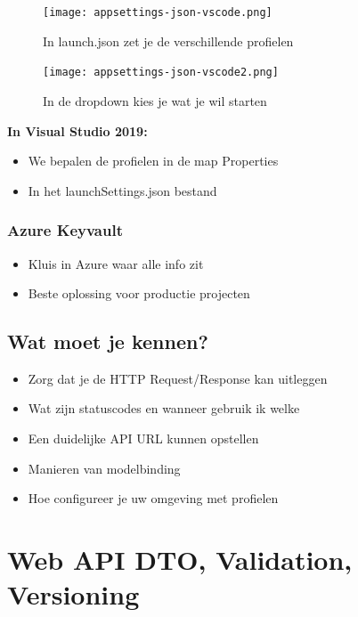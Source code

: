 \documentclass{article}
\begin{document}
\begin{figure}[H]
    \centering
    \texttt{[image: appsettings-json-vscode.png]}
    \caption{In launch.json zet je de verschillende profielen}
\end{figure}

\begin{figure}[H]
    \centering
    \texttt{[image: appsettings-json-vscode2.png]}
    \caption{In de dropdown kies je wat je wil starten}
\end{figure}


\textbf{In Visual Studio 2019:}

\begin{itemize}
    \item We bepalen de profielen in de map Properties
    \item In het launchSettings.json bestand
\end{itemize}

\subsubsection{Azure Keyvault}

\begin{itemize}
    \item Kluis in Azure waar alle info zit
    \item Beste oplossing voor productie projecten
\end{itemize}

\subsection{Wat moet je kennen?}

\begin{itemize}
    \item Zorg dat je de HTTP Request/Response kan uitleggen
    \item Wat zijn statuscodes en wanneer gebruik ik welke
    \item Een duidelijke API URL kunnen opstellen
    \item Manieren van modelbinding
    \item Hoe configureer je uw omgeving met profielen
\end{itemize}

\section{Web API DTO, Validation, Versioning}
\end{document}
